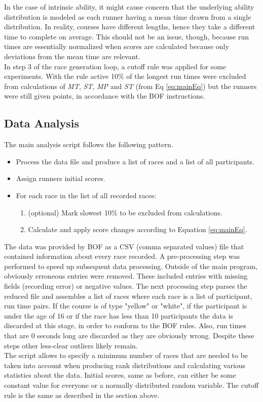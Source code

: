 In the case of intrinsic ability, it might cause concern that the underlying ability distribution is modeled as each runner having a mean time drawn from a single distribution. In reality, courses have different lengths, hence they take a different time to complete on average. This should not be an issue, though, because run times are essentially normalized when scores are calculated because only deviations from the mean time are relevant.\\ 
In step 3 of the race generation loop, a cutoff rule was applied for some experiments. With the rule active 10\% of the longest run times were excluded from calculations of \emph{MT}, \emph{ST}, \emph{MP} and \emph{ST} (from Eq \ref{eq:mainEq}) but the runners were still given points, in accordance with the BOF instructions\cite{bof}.\\ 
%
\subsection{Data Analysis}
The main analysis script follows the following pattern.
\begin{itemize}
\item Process the data file and produce a list of races and a list of all participants.
\item Assign runners initial scores.
\item For each race in the list of all recorded races:
	\begin{enumerate}
	\item (optional) Mark slowest 10\% to be excluded from calculations.
	\item Calculate and apply score changes according to Equation \ref{eq:mainEq}.
	\end{enumerate}
\end{itemize}
The data was provided by BOF as a CSV (comma separated values) file that contained information about every race recorded. A pre-processing step was performed to speed up subsequent data processing. Outside of the main program, obviously erroneous entries were removed. These included entries with missing fields (recording error) or negative values. The next processing step parses the reduced file and assembles a list of races where each race is a list of participant, run time pairs. If the course is of type "yellow" or "white", if the participant is under the age of 16 or if the race has less than 10 participants the data is discarded at this stage, in order to conform to the BOF rules. Also, run times that are 0 seconds long are discarded as they are obviously wrong. Despite these steps other less-clear outliers likely remain.\\
The script allows to specify a minimum number of races that are needed to be taken into account when producing rank distributions and calculating various statistics about the data. Initial scores, same as before, can either be some constant value for everyone or a normally distributed random variable. The cutoff rule is the same as described in the section above.\\
%
